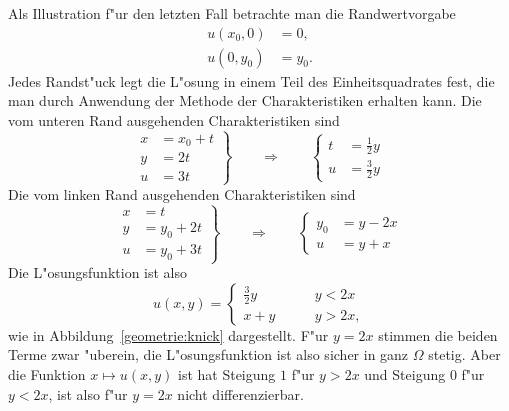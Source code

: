 Als Illustration f"ur den letzten Fall betrachte man die Randwertvorgabe
\begin{align*}
u(x_0,0)&=0,\\
u(0,y_0)&=y_0.
\end{align*}
Jedes Randst"uck legt die L"osung in einem Teil des Einheitsquadrates
fest, die man durch Anwendung der Methode der Charakteristiken erhalten
kann. Die vom unteren Rand ausgehenden Charakteristiken sind
\[
\left.
\begin{aligned}
x&=x_0+t\\
y&=2t\\
u&=3t
\end{aligned}
\right\}
\qquad\Rightarrow\qquad
\left\{
\begin{aligned}
t&=\frac12y\\
u&=\frac32y
\end{aligned}
\right.
\]
Die vom linken Rand ausgehenden Charakteristiken sind 
\[
\left.
\begin{aligned}
x&=t\\
y&=y_0+2t\\
u&=y_0+3t
\end{aligned}
\right\}
\qquad\Rightarrow\qquad
\left\{
\begin{aligned}
y_0&=y-2x\\
u&=y+x
\end{aligned}
\right.
\]
Die L"osungsfunktion ist also
\[
u(x,y)=\begin{cases}
\frac32y&\qquad y<2x\\
x+y&\qquad y>2x,
\end{cases}
\]
wie in Abbildung~\ref{geometrie:knick} dargestellt.
F"ur $y=2x$ stimmen die beiden Terme zwar "uberein, die L"osungsfunktion
ist also sicher in ganz $\Omega$ stetig.
Aber die
Funktion $x\mapsto u(x,y)$ ist hat Steigung $1$ f"ur $y>2x$ und
Steigung 0 f"ur $y<2x$, ist also f"ur $y=2x$ nicht differenzierbar.

